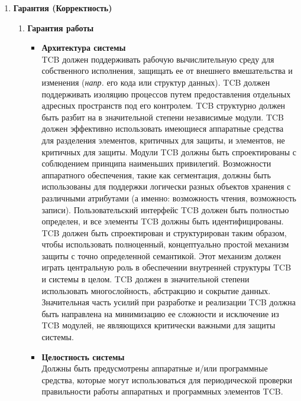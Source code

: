 \begin{enumerate}
\begin{enumerate}
\begin{enumerate}
\begin{enumerate}
                разрушительное действие для прекращения возникновения событий.
            \end{enumerate}
            \item{\textbf{Гарантия (Корректность)}}
            \begin{enumerate}
            \item{\textbf{Гарантия работы}}
                \begin{itemize}
                    \item{\textbf{Архитектура системы}}\\
                    TCB должен поддерживать рабочую вычислительную среду для собственного исполнения, защищать ее от внешнего вмешательства и изменения  (\textit{напр.} его кода или структур данных).
                    TCB должен поддерживать изоляцию процессов путем предоставления отдельных адресных пространств под его контролем. TCB структурно должен быть разбит на в значительной степени
                    независимые модули. TCB должен эффективно использовать имеющиеся аппаратные средства для разделения элементов, критичных для защиты, и элементов, не критичных для защиты.
                    Модули TCB должны быть спроектированы с соблюдением принципа наименьших привилегий. Возможности аппаратного обеспечения, такие как сегментация, должны быть использованы
                    для поддержки логически разных объектов хранения с различными атрибутами (а именно: возможность чтения, возможность записи). Пользовательский интерфейс TCB должен быть полностью
                    определен, и все элементы TCB должны быть идентифицированы. TCB должен быть спроектирован и структурирован таким образом, чтобы использовать полноценный, концептуально
                    простой механизм защиты с точно определенной семантикой. Этот механизм должен играть центральную роль в обеспечении внутренней структуры TCB и системы в целом. TCB должен
                    в значительной степени использовать многослойность, абстракцию и сокрытие данных. Значительная часть усилий при разработке и реализации TCB должна быть направлена на
                    минимизацию ее сложности и исключение из TCB модулей, не являющихся критически важными для защиты системы.
                    \item{\textbf{Целостность системы}}\\
                    Должны быть предусмотрены аппаратные и/или программные средства, которые могут использоваться для периодической проверки правильности работы аппаратных и программных элементов TCB.

\end{itemize}
\end{enumerate}
\end{enumerate}
\end{enumerate}
\end{enumerate}
